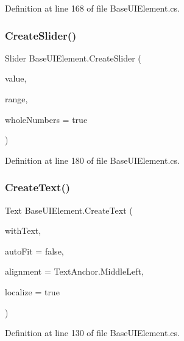Definition at line 168 of file Base\+U\+I\+Element.\+cs.

\mbox{\label{class_base_u_i_element_a79f0d812a1cb543024770f45450c6daf}} 
\subsubsection{\texorpdfstring{Create\+Slider()}{CreateSlider()}}
{\footnotesize\ttfamily Slider Base\+U\+I\+Element.\+Create\+Slider (\begin{DoxyParamCaption}\item[{float}]{value,  }\item[{Vector2}]{range,  }\item[{bool}]{whole\+Numbers = {\ttfamily true} }\end{DoxyParamCaption})\hspace{0.3cm}{\ttfamily [protected]}}



Definition at line 180 of file Base\+U\+I\+Element.\+cs.

\mbox{\label{class_base_u_i_element_ad6793a01923a012a3d0431e74e460029}} 
\subsubsection{\texorpdfstring{Create\+Text()}{CreateText()}}
{\footnotesize\ttfamily Text Base\+U\+I\+Element.\+Create\+Text (\begin{DoxyParamCaption}\item[{string}]{with\+Text,  }\item[{bool}]{auto\+Fit = {\ttfamily false},  }\item[{Text\+Anchor}]{alignment = {\ttfamily TextAnchor.MiddleLeft},  }\item[{bool}]{localize = {\ttfamily true} }\end{DoxyParamCaption})\hspace{0.3cm}{\ttfamily [protected]}}



Definition at line 130 of file Base\+U\+I\+Element.\+cs.

